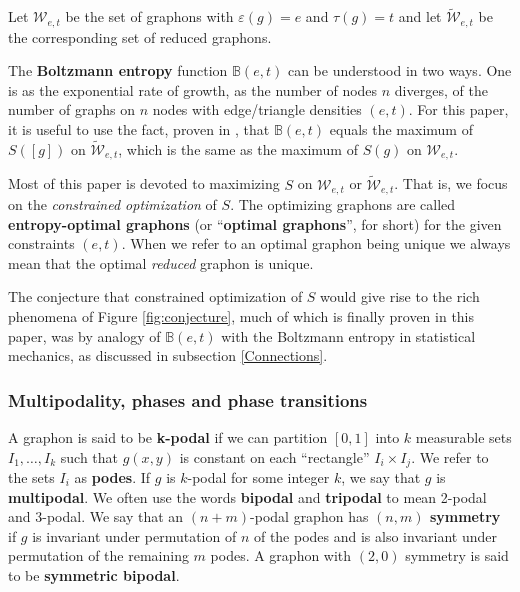 \documentclass[12pt]{amsart}
\newcommand{\tdens}{\tau}
\newcommand{\edens}{\varepsilon}
\newcommand{\B}{\mathbb{B}}
\newcommand{\regular}{\mathcal{W}}
\newcommand{\reduced}{\widetilde {\mathcal{W}}}
\begin{document}
{Let $\regular_{e,t}$ be the set of graphons with 
$\edens(g)=e$ and $\tdens(g)=t$ and let $\reduced_{e,t}$ be the corresponding set of reduced
graphons. 

The {\bf Boltzmann entropy} function $\B(e,t)$ can be 
understood in two ways. One is as the exponential rate 
of growth, as the number of nodes $n$ diverges, of the 
number of graphs on $n$ nodes with edge/triangle 
densities $(e,t)$. For this paper, it is useful to use 
the fact, proven in \cite{RS1,RS3}, that $\B(e,t)$ equals
the maximum of $S([g])$ on $\reduced_{e,t}$, which is 
the same as the maximum of $S(g)$ on $\regular_{e,t}$. 

Most of this paper is devoted to maximizing
$S$ on $\regular_{e,t}$ or $\reduced_{e,t}$. That is, we focus on the {\em constrained optimization} of $S$.
The optimizing graphons are called {\bf entropy-optimal graphons} 
(or ``{\bf optimal graphons}'', for short) for the given constraints $(e,t)$. When we refer to an optimal graphon being
unique we always mean that the optimal {\em reduced} graphon is unique. 

The conjecture \cite{RS3, KRRS1} that constrained 
optimization of $S$ would give rise to the rich 
phenomena of Figure \ref{fig:conjecture}, much of which 
is finally proven in this paper, was by analogy of 
$\B(e,t)$ with the Boltzmann entropy in statistical 
mechanics, as discussed in subsection 
\ref{Connections}. 


\subsubsection
{Multipodality, phases and phase transitions}\phantom{asdf}

A graphon is said to be {\bf k-podal} if we can partition
$[0,1]$ into $k$ measurable sets $I_1, \ldots, I_k$ such that $g(x,y)$ is constant
on each ``rectangle'' $I_i \times I_j$.  
We refer to the sets $I_i$ as {\bf podes}. 
If $g$ is $k$-podal for some integer $k$, we say that $g$ is {\bf multipodal}. We often use the words 
{\bf bipodal} and {\bf tripodal} to mean
2-podal and 3-podal. 
We say that an $(n+m)$-podal graphon has {\bf $(n,m)$ symmetry} if
$g$ is invariant under permutation of $n$ of the podes and is also invariant 
under permutation of the remaining $m$ podes. 
A graphon with $(2,0)$ symmetry is said to be {\bf symmetric bipodal}. 



}
\end{document}
